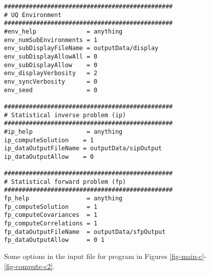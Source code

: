 \begin{figure}[h!]
\begin{center}
\begin{verbatim}
###############################################
# UQ Environment
###############################################
#env_help              = anything
env_numSubEnvironments = 1
env_subDisplayFileName = outputData/display
env_subDisplayAllowAll = 0
env_subDisplayAllow    = 0
env_displayVerbosity   = 2
env_syncVerbosity      = 0
env_seed               = 0

###############################################
# Statistical inverse problem (ip)
###############################################
#ip_help               = anything
ip_computeSolution    = 1
ip_dataOutputFileName = outputData/sipOutput
ip_dataOutputAllow    = 0

###############################################
# Statistical forward problem (fp)
###############################################
fp_help                = anything
fp_computeSolution     = 1
fp_computeCovariances  = 1
fp_computeCorrelations = 1
fp_dataOutputFileName  = outputData/sfpOutput
fp_dataOutputAllow     = 0 1
\end{verbatim}
\end{center}
\caption{
Some options in the input file for program in Figures \ref{fig-main-c}-\ref{fig-compute-c2}.
}
\label{fig-options-input-1}
\end{figure}


